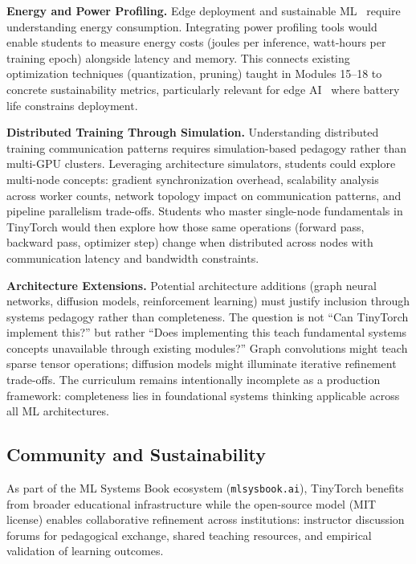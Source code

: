 \documentclass[10pt,twocolumn]{article}
\begin{document}
\textbf{Energy and Power Profiling.} Edge deployment and sustainable ML~\citep{strubell2019, patterson2021carbon} require understanding energy consumption. Integrating power profiling tools would enable students to measure energy costs (joules per inference, watt-hours per training epoch) alongside latency and memory. This connects existing optimization techniques (quantization, pruning) taught in Modules 15--18 to concrete sustainability metrics, particularly relevant for edge AI~\citep{banbury2021benchmarking} where battery life constrains deployment.

\textbf{Distributed Training Through Simulation.} Understanding distributed training communication patterns requires simulation-based pedagogy rather than multi-GPU clusters. Leveraging architecture simulators, students could explore multi-node concepts: gradient synchronization overhead, scalability analysis across worker counts, network topology impact on communication patterns, and pipeline parallelism trade-offs. Students who master single-node fundamentals in TinyTorch would then explore how those same operations (forward pass, backward pass, optimizer step) change when distributed across nodes with communication latency and bandwidth constraints.

\textbf{Architecture Extensions.} Potential architecture additions (graph neural networks, diffusion models, reinforcement learning) must justify inclusion through systems pedagogy rather than completeness. The question is not ``Can TinyTorch implement this?'' but rather ``Does implementing this teach fundamental systems concepts unavailable through existing modules?'' Graph convolutions might teach sparse tensor operations; diffusion models might illuminate iterative refinement trade-offs. The curriculum remains intentionally incomplete as a production framework: completeness lies in foundational systems thinking applicable across all ML architectures.

\subsection{Community and Sustainability}

As part of the ML Systems Book ecosystem (\texttt{mlsysbook.ai}), TinyTorch benefits from broader educational infrastructure while the open-source model (MIT license) enables collaborative refinement across institutions: instructor discussion forums for pedagogical exchange, shared teaching resources, and empirical validation of learning outcomes.
\end{document}
